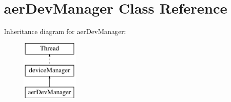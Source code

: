 \hypertarget{classaerDevManager}{\section{aer\-Dev\-Manager Class Reference}
\label{classaerDevManager}
}
Inheritance diagram for aer\-Dev\-Manager\-:\begin{figure}[H]
\begin{center}
\leavevmode
\includegraphics[height=3.000000cm]{classaerDevManager}
\end{center}
\end{figure}
